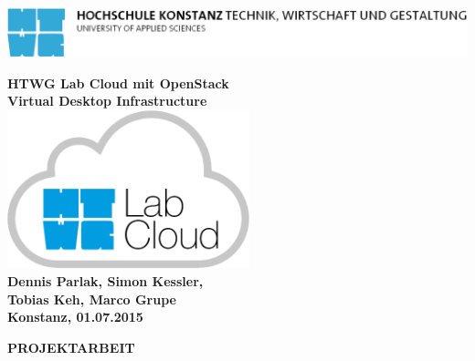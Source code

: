 \begin{titlepage}

\vspace*{-3.5cm}

\begin{flushleft}
\hspace*{-1cm} \includegraphics[width=15.7cm]{htwg-logo}
\end{flushleft}

\vspace{2cm}

\begin{center}
	\huge{
		\textbf{HTWG Lab Cloud mit OpenStack} \\[0.3cm]
	}
	\large{
		\textbf{Virtual Desktop Infrastructure} \\[2cm]
	}
	\includegraphics[width=7cm]{img/logo.png} \\[2cm]
	\Large{
		\textbf{Dennis Parlak, Simon Kessler,\\Tobias Keh, Marco Grupe}} \\[5cm]
	\large{
		\textbf{Konstanz, 01.07.2015} \\[2.3cm]
	}
	
	\Huge{
		\textbf{{\sf PROJEKTARBEIT}}
	}
\end{center}

\end{titlepage}